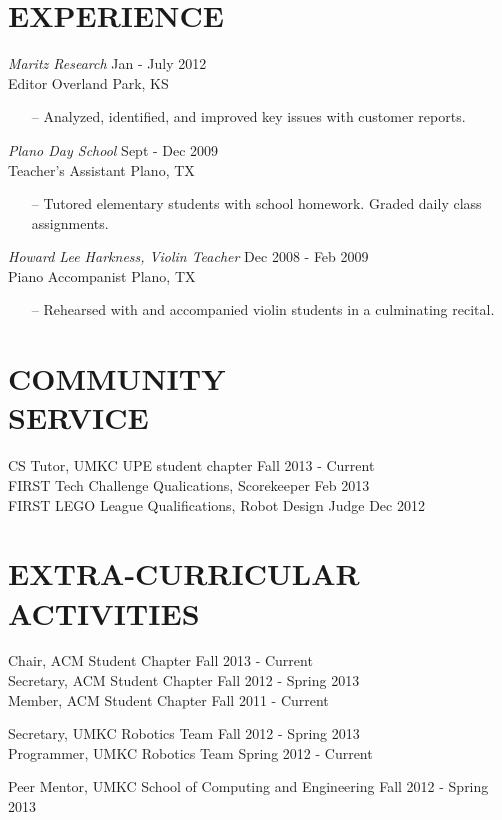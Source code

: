 \documentclass[line,margin]{res}
\begin{document}
\begin{resume}
\section{EXPERIENCE} 
		
		{\it Maritz Research } \hfill            Jan - July 2012\\
		Editor 		\hfill Overland Park, KS
                 \begin{itemize} [leftmargin=5mm]  \itemsep -2pt %
                 \item[--]  Analyzed, identified, and improved  key issues with customer reports.
                 \end{itemize} 
                {\it Plano Day School} \hfill        Sept - Dec  2009\\
        	Teacher's Assistant \hfill Plano, TX 
		\begin{itemize} [leftmargin=5mm] 
                   \item [--] Tutored elementary students with school homework. Graded daily class assignments. 
                   \end{itemize} 

              {\it Howard Lee Harkness, Violin Teacher} \hfill        Dec 2008 - Feb 2009\\
        	Piano Accompanist \hfill Plano, TX 
		\begin{itemize} [leftmargin=5mm] 
                   \item [--] Rehearsed with and accompanied violin students in a culminating recital. 
                   \end{itemize} 

\section{COMMUNITY \\ SERVICE}  
            	CS Tutor, UMKC UPE student chapter  \hfill Fall 2013 - Current \\
                FIRST Tech Challenge Qualications, Scorekeeper \hfill Feb 2013 \\
		FIRST LEGO League Qualifications, Robot Design Judge \hfill Dec 2012 
	
\section{EXTRA-CURRICULAR \\ ACTIVITIES}             
		Chair, ACM Student Chapter \hfill Fall 2013 - Current \\
		Secretary, ACM Student Chapter \hfill Fall 2012 - Spring 2013 \\	
		Member, ACM Student Chapter \hfill Fall 2011 - Current 
		
		Secretary, UMKC Robotics Team \hfill  Fall 2012 - Spring 2013 \\	
		Programmer, UMKC Robotics Team \hfill Spring 2012 - Current 
		
		Peer Mentor, UMKC School of Computing and Engineering \hfill Fall 2012 - Spring 2013 \\	
\end{resume}
\end{document}
